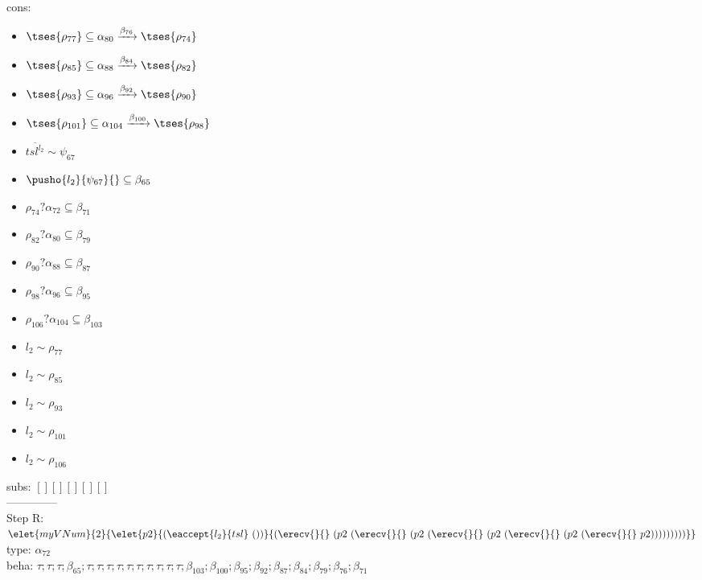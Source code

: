 \documentclass[12pt]{article}
\begin{document}
 \\ cons: \begin{itemize}
\item $  \tses{ \rho_{77}} \subseteq \alpha_{80} \xrightarrow{\beta_{76}}  \tses{ \rho_{74}} $
\item $  \tses{ \rho_{85}} \subseteq \alpha_{88} \xrightarrow{\beta_{84}}  \tses{ \rho_{82}} $
\item $  \tses{ \rho_{93}} \subseteq \alpha_{96} \xrightarrow{\beta_{92}}  \tses{ \rho_{90}} $
\item $  \tses{ \rho_{101}} \subseteq \alpha_{104} \xrightarrow{\beta_{100}}  \tses{ \rho_{98}} $
\item $ \overline{{tsl}^{l_{2}}} \sim\psi_{67} $
\item $ \pusho{ l_{2}} {\psi_{67}}{} \subseteq \beta_{65} $
\item $ \rho_{74}?\alpha_{72} \subseteq \beta_{71} $
\item $ \rho_{82}?\alpha_{80} \subseteq \beta_{79} $
\item $ \rho_{90}?\alpha_{88} \subseteq \beta_{87} $
\item $ \rho_{98}?\alpha_{96} \subseteq \beta_{95} $
\item $ \rho_{106}?\alpha_{104} \subseteq \beta_{103} $
\item $ l_{2} \sim\rho_{77} $
\item $ l_{2} \sim\rho_{85} $
\item $ l_{2} \sim\rho_{93} $
\item $ l_{2} \sim\rho_{101} $
\item $ l_{2} \sim\rho_{106} $
\end{itemize}
 subs:  $ [ ] [] [] [] [] $ 
  \\--------------\\ 
Step R: $ \elet{myVNum}{2}{\elet{p2}{(\eaccept{ l_{2} }{tsl}~())}{(\erecv{}{}~(p2~(\erecv{}{}~(p2~(\erecv{}{}~(p2~(\erecv{}{}~(p2~(\erecv{}{}~p2)))))))))}} $\\
  type: $ \alpha_{72} $ 
\\  beha: $ \tau; \tau; \tau; \beta_{65}; \tau; \tau; \tau; \tau; \tau; \tau; \tau; \tau; \tau; \tau; \beta_{103}; \beta_{100}; \beta_{95}; \beta_{92}; \beta_{87}; \beta_{84}; \beta_{79}; \beta_{76}; \beta_{71} $ 
\end{document}
